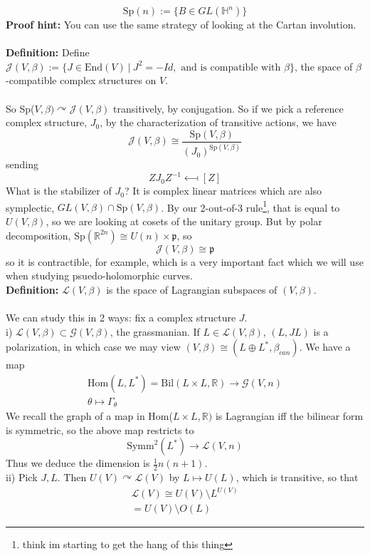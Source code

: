 \documentclass[12pt]{report}
\theoremstyle{definition}
\theoremstyle{remark}
\numberwithin{equation}{section}
\def\acts{\curvearrowright}
\theoremstyle{definition}
\newcommand{\inv}[1]{#1^{-1}}
\newcommand{\bb}[1]{\mathbb{#1}}
\begin{document}
$$
	\text{Sp}(n):= \{B \in GL(\bb H^n)\}
$$
\textbf{Proof hint: }You can use the same strategy of looking at the Cartan involution. \\\\
\textbf{Definition: } Define $\mathcal{J}(V,\beta):= \{J \in \text{End}(V)\ |\ J^2 = -Id, \text{ and is compatible with } \beta\}$, the space of $\beta$-compatible complex structures on $V$. \\\\
So Sp($V,\beta) \acts \mathcal{J}(V,\beta)$ transitively, by conjugation. So if we pick a reference complex structure, $J_0$, by the characterization of transitive actions, we have 
$$
	\mathcal{J}(V,\beta) \cong \frac{\text{Sp}(V,\beta)}{(J_0)^{\text{Sp}(V,\beta)}}
$$
sending
$$
	ZJ_0\inv Z \longmapsfrom [Z]
$$
What is the stabilizer of $J_0$? It is complex linear matrices which are also symplectic, $GL(V,\beta) \cap \text{Sp}(V,\beta)$. By our 2-out-of-3 rule\footnote{think im starting to get the hang of this thing}, that is equal to $U(V,\beta)$, so we are looking at cosets of the unitary group. But by polar decomposition, Sp$(\bb R^{2n}) \cong U(n) \times \mathfrak{p}$, so 
$$
	\mathcal{J}(V,\beta) \cong \mathfrak{p}
$$
so it is contractible, for example, which is a very important fact which we will use when studying psuedo-holomorphic curves. \\
\textbf{Definition: } $\mathcal{L}(V,\beta)$ is the space of Lagrangian subspaces of $(V,\beta)$. \\\\
We can study this in 2 ways: fix a complex structure $J$. \\
i) $\mathcal{L}(V,\beta) \subset \mathcal{G}(V,\beta)$, the grassmanian. If $L \in \mathcal{L}(V,\beta)$, $(L,JL)$ is a polarization, in which case we may view $(V,\beta) \cong (L \oplus L^*, \beta_{can})$. We have a map
\begin{gather*}
	\text{Hom}(L,L^*)= \text{Bil}(L \times L, \bb R) \to \mathcal{G}(V,n)\\
	\theta \mapsto \Gamma_\theta
\end{gather*}
We recall the graph of a map in Hom($L \times L, \bb R)$ is Lagrangian iff the bilinear form is symmetric, so the above map restricts to 
$$
	\text{Symm}^2(L^*) \to \mathcal{L}(V,n)
$$
Thus we deduce the dimension is $\frac{1}{2}n(n+1)$. \\
ii) Pick $J,L$. Then $U(V) \acts \mathcal{L}(V)$ by $L \mapsto U(L)$, which is transitive, so that
\begin{gather*}
	\mathcal{L}(V) \cong U(V) \setminus L^{U(V)} \\
	= U(V) \setminus O(L)
\end{gather*}
\end{document}
